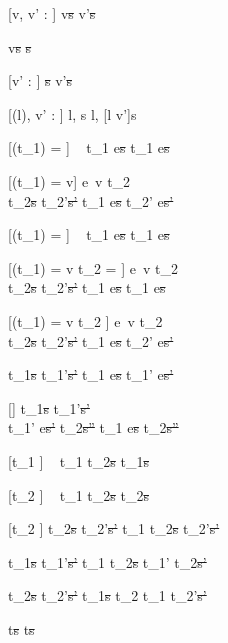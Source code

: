 [v, v' : \tau]
  { }
  {\Edit v\st{s}  \Edit v'\st{s}}

  { }
  {\Edit v\st{s} \handle{\Clear} \Empty\st{s}}

[v' : \tau]
  { }
  {\Empty \tau\st{s}  \Edit v'\st{s}}

[\Sigma(l), v' : \tau]
  { }
  {\Watch l, s  \Watch l, [l \mapsto v']s}

[\Value(t_1) = \nothing]
  {\ }
  {t_1 \Then e\st{s} \handle{\Next} t_1 \Then e\st{s}}

[\Value(t_1) = v]
  {e\ v \downto t_2    \\
   t_2\st{s} \normalise t_2'\st{s'} }
  {t_1 \Then e\st{s} \handle{\Next} t_2' \Then e\st{s'}}

[\Value(t_1) = \nothing]
  {\ }
  {t_1 \When e\st{s} \handle{\Execute \pi} t_1 \When e\st{s}}

[\Value(t_1) = v \land t_2 = \Fail]
  {e\ v \downto t_2    \\
   t_2\st{s} \handle{\Pick \pi} t_2'\st{s'} }
  {t_1 \When e\st{s} \handle{\Execute \pi} t_1 \When e\st{s}}

[\Value(t_1) = v \land t_2 \neq \Fail]
  {e\ v \downto t_2    \\
   t_2\st{s} \handle{\Pick \pi} t_2'\st{s'} }
  {t_1 \When e\st{s} \handle{\Execute \pi} t_2' \When e\st{s'}}

  {t_1\st{s} \handle{\eta} t_1'\st{s'}}
  {t_1 \Then e\st{s} \handle{\eta} t_1' \Then e\st{s'}}

[\eta \neq \Execute \pi]
  {t_1\st{s} \handle{\eta} t_1'\st{s'}       \\
   t_1' \When e\st{s'} \normalise t_2\st{s''} }
  {t_1 \When e\st{s} \handle{\eta} t_2\st{s''}}

[t_1 \neq \Fail]
  {\ }
  {t_1 \Or t_2\st{s} \handle{\Pick \First} t_1\st{s}}

[t_2 \neq \Fail]
  {\ }
  {t_1 \Or t_2\st{s} \handle{\Pick \Second} t_2\st{s}}

[t_2 \neq \Fail]
  {t_2\st{s} \handle{\Pick \pi} t_2'\st{s'}}
  {t_1 \Or t_2\st{s} \handle{\Pick \Other \pi} t_2'\st{s'}}


  {t_1\st{s} \handle{\eta} t_1'\st{s'} }
  {t_1 \AndOr t_2\st{s} \handle{\Left \eta} t_1' \AndOr t_2\st{s'}}

  {t_2\st{s} \handle{\eta} t_2'\st{s'} }
  {t_1\st{s} \AndOr t_2 \handle{\Right \eta} t_1 \AndOr t_2'\st{s'}}

  { }
  {t\st{s} \handle{\eta} t\st{s}}
